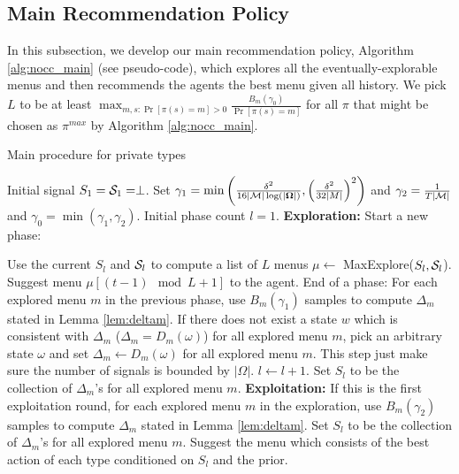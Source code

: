 \subsection{Main Recommendation Policy}
\label{sec:private_main}
In this subsection, we develop our main recommendation policy, Algorithm \ref{alg:nocc_main} (see pseudo-code), which explores all the eventually-explorable menus and then recommends the agents the best menu given all history. We pick $L$ to be at least $\max_{m,s:\Pr[\pi(s)=m] >0} \frac{B_m(\gamma_0)}{ \Pr[\pi(s)=m]}$ for all $\pi$ that might be chosen as $\pi^{max}$ by Algorithm \ref{alg:nocc_main}.

 \begin{algorithm}[t]
    \caption{Main procedure for private types }
    	\label{alg:nocc_main}
    \begin{algorithmic}[1]
    	\STATE Initial signal $S_1 = \S_1= \perp$.
    	\STATE Set $\gamma_1 =\min\left(\frac{\delta^2}{16|\M|\log(|\varOmega|)},\left( \frac{\delta^2}{32|M|}\right)^2\right)$ and $\gamma_2 =  \frac{1}{T|\M|}$ and $\gamma_0=\min(\gamma_1,\gamma_2)$.
	\STATE Initial phase count $l = 1$.
		\STATE \textbf{Exploration:}
			\STATE Start a new phase:
			
			\STATE Use the current $S_l$ and $\S_l$ to compute a list of $L$ menus $\mu \leftarrow $ MaxExplore($S_l, \S_l$).
		\ENDIF
		\STATE Suggest menu $\mu [ (t-1) \mod L + 1]$ to the agent.
			\STATE End of a phase:
			\STATE For each explored menu $m$ in the previous phase, use $B_m(\gamma_1)$ samples to compute $\Delta_m$ stated in Lemma \ref{lem:deltam}.
			\STATE If there does not exist a state $w$ which is consistent with $\Delta_m$ ($\Delta_m = D_m(\omega)$) for all explored menu $m$, pick an arbitrary state $\omega$ and set $\Delta_m \leftarrow D_m(\omega)$ for all explored menu $m$. This step just make sure the number of signals is bounded by $|\varOmega|$.
			\STATE $l \leftarrow l + 1$.
			\STATE Set $S_l$ to be the collection of $\Delta_m$'s for all explored menu $m$.
		\ENDIF
	\ELSE
		\STATE \textbf{Exploitation:}
		\STATE If this is the first exploitation round, for each explored menu $m$ in the exploration, use $B_m(\gamma_2)$ samples to compute $\Delta_m$ stated in Lemma \ref{lem:deltam}. Set $S_l$ to be the collection of $\Delta_m$'s for all explored menu $m$.
		\STATE Suggest the menu which consists of the best action of each type conditioned on $S_l$ and the prior.
	\ENDIF
	\ENDFOR
     \end{algorithmic}
\end{algorithm}

